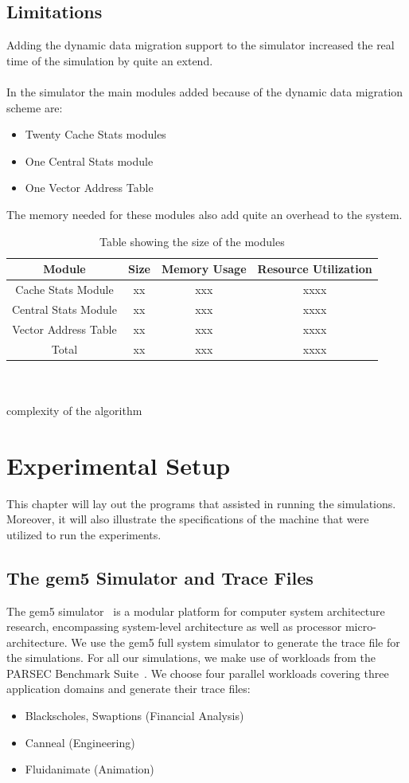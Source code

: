 \documentclass{listhesis}
\begin{document}
\section{Limitations}
Adding the dynamic data migration support to the simulator increased the real time of the simulation by quite an extend. \\
\\
In the simulator the main modules added because of the dynamic data migration scheme are:
\begin{itemize}
  \item Twenty Cache Stats modules
  \item One Central Stats module 
  \item One Vector Address Table
\end{itemize}
The memory needed for these modules also add quite an overhead to the system. 
\begin{table}[h!]
\begin{center}
 \begin{tabular}{||c c c c||} 
 \hline
 Module & Size & Memory Usage   & Resource Utilization \\ [0.5 ex] 
 \hline\hline
 Cache Stats Module & xx & xxx & xxxx \\ 
 \hline
 Central Stats Module & xx & xxx & xxxx \\
 \hline
 Vector Address Table & xx & xxx & xxxx \\
 \hline\hline
 Total  & xx & xxx & xxxx \\
  \hline
\end{tabular}
 \caption{Table showing the size of the modules}
\end{center}
\end{table}
\\
\\
complexity of the algorithm
\chapter{Experimental Setup}
This chapter will lay out the programs that assisted in running the simulations. Moreover, it will also illustrate the specifications of the machine that were utilized to run the experiments.
\section{The gem5 Simulator and Trace Files}
The gem5 simulator~\cite{gem5} is a modular platform for computer system architecture research, encompassing system-level architecture as well as processor micro-architecture. We use the gem5 full system simulator to generate the trace file for the simulations. For all our simulations, we make use of workloads from the PARSEC Benchmark Suite~\cite{lispaper}. We choose four parallel workloads covering three application domains and generate their trace files:
\begin{itemize}
\item Blackscholes, Swaptions (Financial Analysis)
\item Canneal (Engineering)
\item Fluidanimate (Animation)
\end{itemize}
\end{document}
